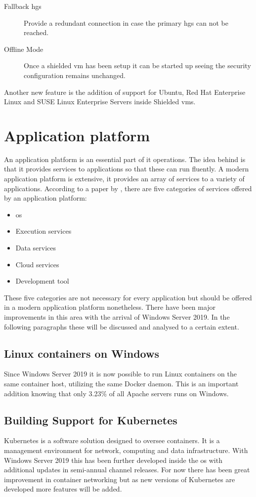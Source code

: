 \begin{description}
	\item[Fallback \acrshort{hgs}] Provide a redundant connection in case the primary \acrshort{hgs} can not be reached.
	\item[Offline Mode] Once a shielded \acrshort{vm} has been setup it can be started up seeing the security configuration remains unchanged.
\end{description}

Another new feature is the addition of support for Ubuntu, Red Hat Enterprise Linux and SUSE Linux Enterprise Servers inside Shielded \acrshort{vm}s. 

\section{Application platform}
An application platform is an essential part of \acrshort{it} operations. The idea behind is that it provides services to applications so that these can run fluently. A modern application platform is extensive, it provides an array of services to a variety of applications. According to a paper by \textcite{Chappell2011}, there are five categories of services offered by an application platform:
\begin{itemize}
	\item \acrfull{os}
	\item Execution services
	\item Data services
	\item Cloud services
	\item Development tool
\end{itemize}
These five categories are not necessary for every application but should be offered in a modern application platform nonetheless.
There have been major improvements in this area with the arrival of Windows Server 2019.\autocite{Gerend2018} In the following paragraphs these will be discussed and analysed to a certain extent.

\subsection*{Linux containers on Windows}
Since Windows Server 2019 it is now possible to run Linux containers on the same container host, utilizing the same Docker daemon. This is an important addition knowing that only 3.23\% of all Apache servers runs on Windows. \autocite{SecuritySpace2019}
\subsection*{Building Support for Kubernetes}
Kubernetes is a software solution designed to oversee containers. It is a management environment for network, computing and data infrastructure. With Windows Server 2019 this has been further developed inside the \acrshort{os} with additional updates in semi-annual channel releases. For now there has been great improvement in container networking but as new versions of Kubernetes are developed more features will be added.
